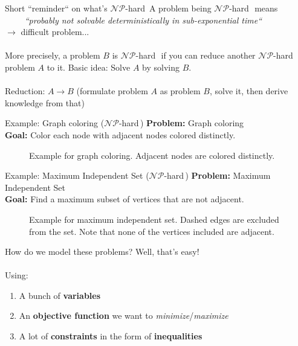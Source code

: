 \documentclass[10pt]{beamer}
\newcommand{\primaryColorB}[1]{\textcolor{mpigreen}{\textbf{#1}}}
\newcommand{\q}[1]{``#1``}
\newcommand{\nphard}{$\mathcal{NP}$-hard\,}
\begin{document}
\begin{frame}{Short \q{reminder} on what's \nphard}
A problem being \nphard\, means \\$\qquad$ \textit{\q{probably not solvable deterministically in sub-exponential time}}\\ $\rightarrow$ difficult problem...\\\,\\
More precisely, a problem $B$ is \nphard\, if you can reduce another \nphard problem $A$ to it. Basic idea: Solve $A$ by solving $B$.\\\,\\
Reduction: $A \rightarrow B$ (formulate problem $A$ as problem $B$, solve it, then derive knowledge from that)
\end{frame}

\begin{frame}{Example: Graph coloring (\nphard)}
\primaryColorB{Problem:} Graph coloring\\
\primaryColorB{Goal:} Color each node with adjacent nodes colored distinctly.\\

\begin{figure}
	\centering
	\scalebox{0.6}{\chromaticNumber}
	\caption{Example for graph coloring. Adjacent nodes are colored distinctly.}
\end{figure}
\end{frame}



\begin{frame}{Example: Maximum Independent Set (\nphard)}
\primaryColorB{Problem:} Maximum Independent Set\\
\primaryColorB{Goal:} Find a maximum subset of vertices that are not adjacent.\\

\begin{figure}
	\centering
	\scalebox{0.8}{\maxIndependentSet}
	\caption{Example for maximum independent set. Dashed edges are excluded from the set. Note that none of the vertices included are adjacent.}
\end{figure}
\end{frame}

\begin{frame}{How do we model these problems?}
Well, that's easy!\\\,\\

Using:
\begin{enumerate}
	\item A bunch of \primaryColorB{variables}
	\item An \primaryColorB{objective function} we want to \textit{minimize}/\textit{maximize}
	\item A lot of \primaryColorB{constraints} in the form of \primaryColorB{inequalities}
\end{enumerate}

\end{frame}
\end{document}
